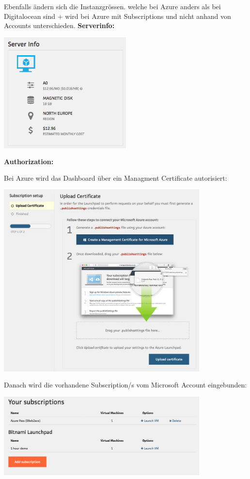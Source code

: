 Ebenfalls ändern sich die Instanzgrössen. welche bei Azure anders als bei 
Digitalocean sind + wird bei Azure mit Subscriptions und nicht anhand von 
Accounts unterschieden.
\textbf{Serverinfo:}

\includegraphics[width=0.5\textwidth]{./03_Analyse/03_Bitnami/images/azure_serverinfo}

\textbf{Authorization:}

Bei Azure wird das Dashboard über ein Managment Certificate autorisiert:

\includegraphics[width=0.8\textwidth]{./03_Analyse/03_Bitnami/images/azure_authorize}

Danach wird die vorhandene Subscription/s vom Microsoft Account eingebunden:

\includegraphics[width=0.8\textwidth]{./03_Analyse/03_Bitnami/images/azure_subscriptions}


